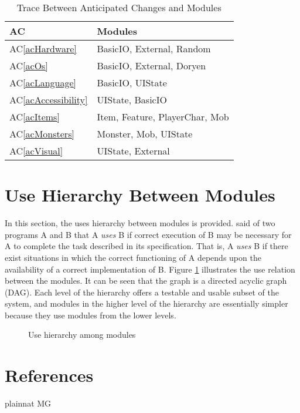 \documentclass[12pt, titlepage]{article}
\newcommand{\newSection}[1]{
  \newpage
  \section{#1}
}
\newcommand{\acref}[1]{AC\ref{#1}}
\begin{document}
\begin{table}[H]
	\centering
	\begin{tabular}{p{} p{}}

		\toprule
		\textbf{AC} & \textbf{Modules}\\
		\midrule
		\acref{acHardware} & BasicIO, External, Random\\
		\acref{acOs} & BasicIO, External, Doryen\\
		\acref{acLanguage} & BasicIO, UIState\\
		\acref{acAccessibility} & UIState, BasicIO\\
		\acref{acItems} & Item, Feature, PlayerChar, Mob\\
		\acref{acMonsters} & Monster, Mob, UIState\\
		\acref{acVisual} & UIState, External\\

		\bottomrule
	\end{tabular}

	\caption{Trace Between Anticipated Changes and Modules}
	\label{TblACT}
\end{table}

\newSection{Use Hierarchy Between Modules} \label{SecUse}

	In this section, the uses hierarchy between modules is provided. \citet{Parnas1978} said of two programs A and B that A {\em uses} B if correct execution of B may be necessary for A to complete the task described in its specification. That is, A {\em uses} B if there exist situations in which the correct functioning of A depends upon the availability of a correct implementation of B.  Figure \ref{FigUH} illustrates the use relation between the modules. It can be seen that the graph is a directed acyclic graph (DAG). Each level of the hierarchy offers a testable and usable subset of the system, and modules in the higher level of the hierarchy are essentially simpler because they use modules from the lower levels.

	\begin{figure}[H]
		\centering
		\caption{Use hierarchy among modules}
		\label{FigUH}
	\end{figure}

\newSection{References}

	 {plainnat}
	 {MG}
\end{document}
